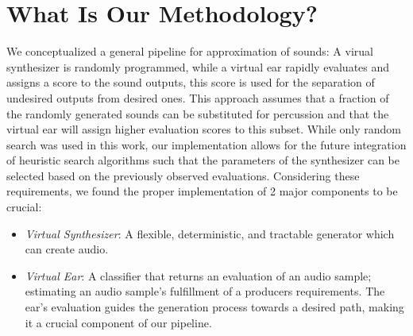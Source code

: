 \documentclass[\main/thesis.tex]{subfiles}
\begin{document}

\section{What Is Our Methodology?}
\label{sec_methodology}
We conceptualized a general pipeline for approximation of sounds: A virual synthesizer is randomly programmed, while a virtual ear rapidly evaluates and assigns a score to the sound outputs, this score is used for the separation of undesired outputs from desired ones. This approach assumes that a fraction of the randomly generated sounds can be substituted for percussion and that the virtual ear will assign higher evaluation scores to this subset. While only random search was used in this work, our implementation allows for the future integration of heuristic search algorithms such that the parameters of the synthesizer can be selected based on the previously observed evaluations. Considering these requirements, we found the proper implementation of 2 major components to be crucial:

\begin{itemize}
    \item \textit{Virtual Synthesizer}: A flexible, deter\-min\-istic, and tract\-able gener\-ator which can create audio. 
    \item \textit{Virtual Ear}: A classifier that returns an evaluation of an audio sample; estimating an audio sample's fulfillment of a producers requirements. The ear's evaluation guides the generation process towards a desired path, making it a crucial component of our pipeline. 
\end{itemize}
\end{document}
